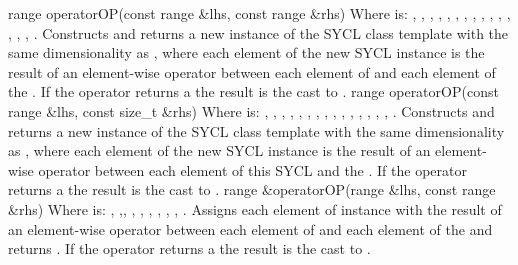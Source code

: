     \addRow
    { range operatorOP(const range \&lhs, const range \&rhs) }
    {
      Where  is: \codeinline{+}, \codeinline{-}, \codeinline{*},
      \codeinline{/}, \codeinline{\%}, \codeinline{<<}, \codeinline{>>},
      \codeinline{\&}, \codeinline{|}, \codeinline{^},
      \codeinline{\&\&}, \codeinline{||},
      \codeinline{<}, \codeinline{>}, \codeinline{<=},
      \codeinline{>=}.
      \newline
      Constructs and returns a new instance of the SYCL  class
      template with the same dimensionality as  ,
      where each element of the new SYCL  instance is the
      result of an element-wise  operator between each element of
        and each element of the 
      . If the operator returns a  the result
      is the cast to .
    }
  \addRow
    { range operatorOP(const range \&lhs, const size_t \&rhs) }
    {
      Where  is: \codeinline{+}, \codeinline{-}, \codeinline{*},
      \codeinline{/}, \codeinline{\%}, \codeinline{<<}, \codeinline{>>},
      \codeinline{\&}, \codeinline{|}, \codeinline{^},
      \codeinline{\&\&}, \codeinline{||},
      \codeinline{<}, \codeinline{>}, \codeinline{<=},
      \codeinline{>=}.
      \newline
      Constructs and returns a new instance of the SYCL  class
      template with the same dimensionality as  ,
      where each element of the new SYCL  instance is the result
      of an element-wise  operator between each element of this
      SYCL  and the  . If
      the operator returns a  the result is the cast to
      .
    }
  \addRow
    { range \&operatorOP(range \&lhs, const range \&rhs) }
    {
      Where  is: \codeinline{+=}, \codeinline{-=},\codeinline{
      *=}, \codeinline{/=}, \codeinline{\%=}, \codeinline{<<=}, \codeinline{
      >>=}, \codeinline{\&=}, \codeinline{|=}, \codeinline{^=}.
      \newline
      Assigns each element of   instance with the
      result of an element-wise  operator between each element
      of   and each element of the 
       and returns  . If the operator returns a  the result is the cast
      to .
    }
